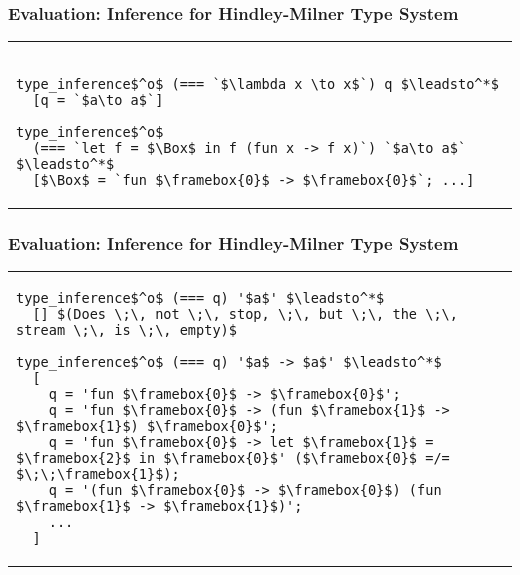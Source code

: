 \documentclass{beamer}
\theoremstyle{definition}
\begin{document}
\begin{frame}[fragile]\frametitle{Evaluation: Inference for Hindley-Milner Type System}

\begin{tabular}{l}
\begin{lstlisting}

type_inference$^o$ (=== `$\lambda x \to x$`) q $\leadsto^*$ 
  [q = `$a\to a$`]

type_inference$^o$ 
  (=== `let f = $\Box$ in f (fun x -> f x)`) `$a\to a$` $\leadsto^*$ 
  [$\Box$ = `fun $\framebox{0}$ -> $\framebox{0}$`; ...]
\end{lstlisting}
\end{tabular}

\begin{comment}

    (Let ("f", q, App(Var "f", 
       Abst("x", App(Var "f", Var "x"))))) 
    (Just TBool))

==> [
    q = Abst (_.74, Var (_.74)); 
    q = Abst (_.44, Abst (_.90, Var (_.90))); 
    q = Let (_.44, Lit (LInt (_.58)), 
        Abst (_.130, Var (_.130))); 
    ...
}

\end{comment}
\end{frame}

\begin{frame}[fragile]\frametitle{Evaluation: Inference for Hindley-Milner Type System}


\begin{tabular}{l}
\begin{lstlisting}
type_inference$^o$ (=== q) '$a$' $\leadsto^*$ 
  [] $(Does \;\, not \;\, stop, \;\, but \;\, the \;\, stream \;\, is \;\, empty)$

type_inference$^o$ (=== q) '$a$ -> $a$' $\leadsto^*$ 
  [
    q = 'fun $\framebox{0}$ -> $\framebox{0}$'; 
    q = 'fun $\framebox{0}$ -> (fun $\framebox{1}$ -> $\framebox{1}$) $\framebox{0}$'; 
    q = 'fun $\framebox{0}$ -> let $\framebox{1}$ = $\framebox{2}$ in $\framebox{0}$' ($\framebox{0}$ =/= $\;\;\framebox{1}$);
    q = '(fun $\framebox{0}$ -> $\framebox{0}$) (fun $\framebox{1}$ -> $\framebox{1}$)';
    ...
  ]
\end{lstlisting}
\end{tabular}
\end{frame}

\end{document}
